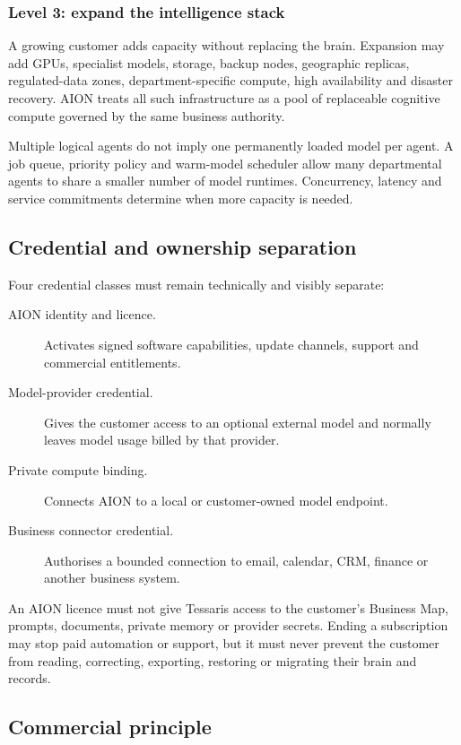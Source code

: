\subsubsection{Level 3: expand the intelligence stack}

A growing customer adds capacity without replacing the brain. Expansion may add GPUs, specialist
models, storage, backup nodes, geographic replicas, regulated-data zones, department-specific
compute, high availability and disaster recovery. AION treats all such infrastructure as a pool
of replaceable cognitive compute governed by the same business authority.

Multiple logical agents do not imply one permanently loaded model per agent. A job queue,
priority policy and warm-model scheduler allow many departmental agents to share a smaller number
of model runtimes. Concurrency, latency and service commitments determine when more capacity is
needed.

\subsection{Credential and ownership separation}

Four credential classes must remain technically and visibly separate:

\begin{description}
  \item[AION identity and licence.] Activates signed software capabilities, update channels,
        support and commercial entitlements.
  \item[Model-provider credential.] Gives the customer access to an optional external model and
        normally leaves model usage billed by that provider.
  \item[Private compute binding.] Connects AION to a local or customer-owned model endpoint.
  \item[Business connector credential.] Authorises a bounded connection to email, calendar, CRM,
        finance or another business system.
\end{description}

An AION licence must not give Tessaris access to the customer's Business Map, prompts, documents,
private memory or provider secrets. Ending a subscription may stop paid automation or support,
but it must never prevent the customer from reading, correcting, exporting, restoring or migrating
their brain and records.

\subsection{Commercial principle}

